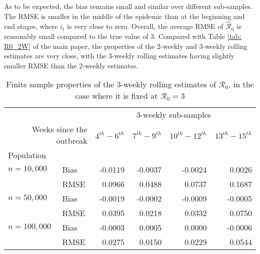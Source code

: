 \documentclass[12pt]{article}
\begin{document}
As to be expected, the bias remains small and similar over different
sub-samples. The RMSE is smaller in the middle of the epidemic than at the
beginning and end stages, where $i_{t}$ is very close to zero. Overall, the
average RMSE of $\mathcal{\hat{R}}_{0}$ is reasonably small compared to the
true value of $3$. Compared with Table \ref{tab: R0_2W} of the main paper, the
properties of the $2$-weekly and $3$-weekly rolling estimates are very close,
with the $3$-weekly rolling estimates having slightly smaller RMSE than the
$2$-weekly estimates.%

\begin{table}[tbh]%
\caption
{Finite sample properties of the 3-weekly rolling estimates of $\mathcal
{R}_0$, in the case where it is fixed at ${\mathcal{R}_0}=3$}%
\label{tab: R0_3W}%
\renewcommand{\arraystretch}{1.1}%
\vspace{-0.35cm}%


\begin{center}%
\begin{tabular}
[c]{llcccc}\hline
&  & \multicolumn{4}{c}{3-weekly sub-samples}\\\cline{3-6}%
\multicolumn{2}{r}{Weeks since the outbreak} & $4^{th}-6^{th}$ &
$7^{th}-9^{th}$ & $10^{th}-12^{th}$ & $13^{th}-15^{th}$\\\hline
Population &  & \multicolumn{1}{r}{} & \multicolumn{1}{r}{} &
\multicolumn{1}{r}{} & \multicolumn{1}{r}{}\\
$n=10,000$ & Bias & \multicolumn{1}{r}{-0.0119} & \multicolumn{1}{r}{-0.0037}
& \multicolumn{1}{r}{-0.0024} & \multicolumn{1}{r}{0.0026}\\
& RMSE & \multicolumn{1}{r}{0.0966} & \multicolumn{1}{r}{0.0488} &
\multicolumn{1}{r}{0.0737} & \multicolumn{1}{r}{0.1687}\\
$n=50,000$ & Bias & \multicolumn{1}{r}{-0.0019} & \multicolumn{1}{r}{-0.0002}
& \multicolumn{1}{r}{-0.0009} & \multicolumn{1}{r}{-0.0005}\\
& RMSE & \multicolumn{1}{r}{0.0395} & \multicolumn{1}{r}{0.0218} &
\multicolumn{1}{r}{0.0332} & \multicolumn{1}{r}{0.0750}\\
$n=100,000$ & Bias & \multicolumn{1}{r}{-0.0003} & \multicolumn{1}{r}{0.0005}
& \multicolumn{1}{r}{0.0000} & \multicolumn{1}{r}{-0.0006}\\
& RMSE & \multicolumn{1}{r}{0.0275} & \multicolumn{1}{r}{0.0150} &
\multicolumn{1}{r}{0.0229} & \multicolumn{1}{r}{0.0544}\\\hline
\end{tabular}




\end{center}
\end{table}
\end{document}
